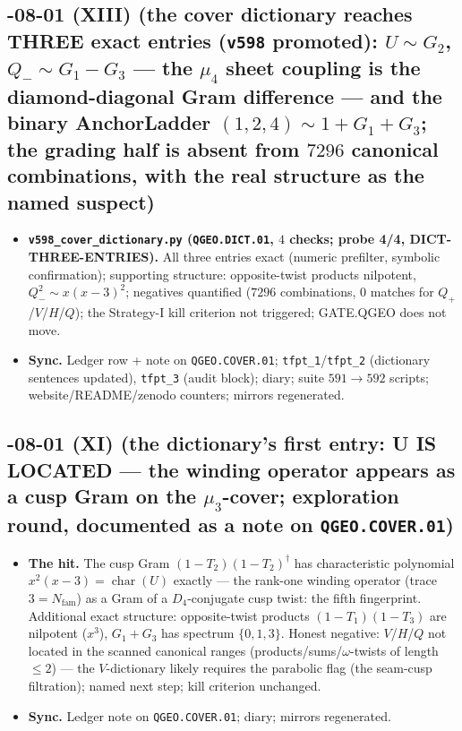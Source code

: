 \subsection*{-08-01 (XIII) (the cover dictionary reaches THREE exact entries (\texttt{v598} promoted): $U\sim G_2$, $Q_-\sim G_1-G_3$ --- the $\mu_4$ sheet coupling is the diamond-diagonal Gram difference --- and the binary AnchorLadder $(1,2,4)\sim1+G_1+G_3$; the grading half is absent from $7296$ canonical combinations, with the real structure as the named suspect)}
\begin{itemize}[leftmargin=1.5em]
\item \textbf{\texttt{v598\_cover\_dictionary.py} (\texttt{QGEO.DICT.01}, $4$ checks; probe
4/4, DICT-THREE-ENTRIES).} All three entries exact (numeric prefilter, symbolic
confirmation); supporting structure: opposite-twist products nilpotent, $Q_-^2\sim x(x-3)^2$;
negatives quantified ($7296$ combinations, $0$ matches for $Q_+$/$V$/$H$/$Q$); the
Strategy-I kill criterion not triggered; GATE.QGEO does not move.
\item \textbf{Sync.} Ledger row + note on \texttt{QGEO.COVER.01};
\texttt{tfpt\_1}/\texttt{tfpt\_2} (dictionary sentences updated), \texttt{tfpt\_3} (audit
block); diary; suite $591\to592$ scripts; website/README/zenodo counters; mirrors
regenerated.
\end{itemize}

\subsection*{-08-01 (XI) (the dictionary's first entry: U IS LOCATED --- the winding operator appears as a cusp Gram on the $\mu_3$-cover; exploration round, documented as a note on \texttt{QGEO.COVER.01})}
\begin{itemize}[leftmargin=1.5em]
\item \textbf{The hit.} The cusp Gram $(1-T_2)(1-T_2)^\dagger$ has characteristic polynomial
$x^2(x-3)=\operatorname{char}(U)$ exactly --- the rank-one winding operator (trace $3=N_{\mathrm{fam}}$)
as a Gram of a $D_4$-conjugate cusp twist: the fifth fingerprint.  Additional exact structure:
opposite-twist products $(1-T_1)(1-T_3)$ are nilpotent ($x^3$), $G_1+G_3$ has spectrum
$\{0,1,3\}$.  Honest negative: $V$/$H$/$Q$ not located in the scanned canonical ranges
(products/sums/$\omega$-twists of length $\le2$) --- the $V$-dictionary likely requires the
parabolic flag (the seam-cusp filtration); named next step; kill criterion unchanged.
\item \textbf{Sync.} Ledger note on \texttt{QGEO.COVER.01}; diary; mirrors regenerated.
\end{itemize}

